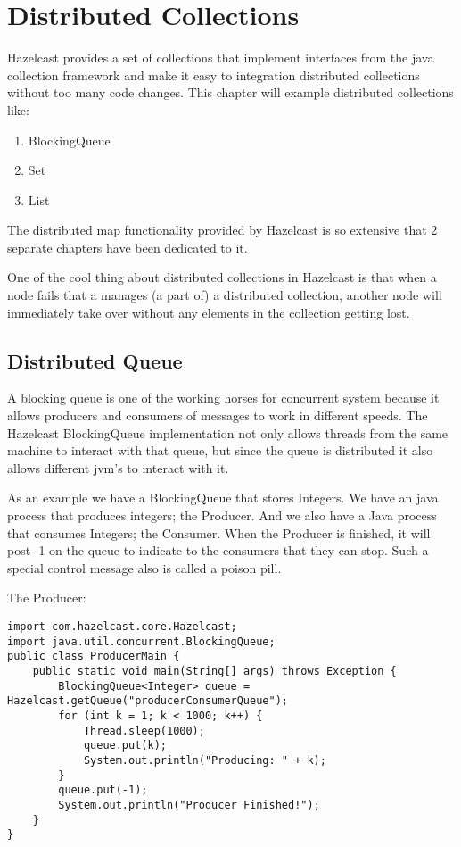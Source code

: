 \chapter{Distributed Collections}

Hazelcast provides a set of collections that implement interfaces from the java collection 
framework and make it easy to integration distributed collections without too many code changes.
This chapter will example distributed collections like:
\begin{enumerate}
\item BlockingQueue
\item Set
\item List
\end{enumerate}
The distributed map functionality provided by Hazelcast is so extensive that 2 separate chapters
have been dedicated to it. 

One of the cool thing about distributed collections in Hazelcast is that when a node fails that
a manages (a part of) a distributed collection, another node will immediately take over without
any elements in the collection getting lost.

\section{Distributed Queue}

A blocking queue is one of the working horses for concurrent system because it 
allows producers and consumers of messages to work in different speeds. The Hazelcast BlockingQueue
implementation not only allows threads from the same machine to interact with that queue, but
since the queue is distributed it also allows different jvm's to interact with it.

As an example we have a BlockingQueue that stores Integers. We have an java process that produces
integers; the Producer. And we also have a Java process that consumes Integers; the Consumer. When the
Producer is finished, it will post -1 on the queue to indicate to the consumers that they can stop. Such
a special control message also is called a poison pill.

The Producer:
\begin{verbatim}
import com.hazelcast.core.Hazelcast;
import java.util.concurrent.BlockingQueue;
public class ProducerMain {
    public static void main(String[] args) throws Exception {
        BlockingQueue<Integer> queue = Hazelcast.getQueue("producerConsumerQueue");
        for (int k = 1; k < 1000; k++) {
            Thread.sleep(1000);  
            queue.put(k);
            System.out.println("Producing: " + k);
        }
        queue.put(-1);
        System.out.println("Producer Finished!");
    }
}
\end{verbatim}

